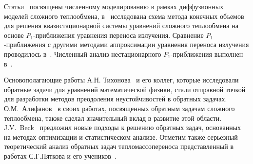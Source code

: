     Статьи~\cite{kovtanyuk2013iterative, Thommes2002, Pinnau2008, Siewert1991}
    посвящены численному моделированию в рамках
    диффузионных моделей сложного теплообмена, в~\cite{gallouet2016analysis} исследована схема
    метода конечных объемов для решения квазистационарной системы
    уравнений сложного теплообмена на основе
    $P_1$-приближения уравнения переноса излучения.
    Сравнение $P_1$-приближения с другими методами
    аппроксимации уравнения переноса излучения проводилось
    в~\cite{modest2014elliptic, frank2011adaptive, kovtanyuk2012, Thommes2002, Larsen2002, Frank2007}.
    Численный анализ нестационарного $P_1$-приближения выполнен
    в~\cite{Addam2015, olbrant2013asymptotic, frank2010optimal, frank2011adaptive, Frank2007}.

    Основополагающие работы А.Н. Тихонова~\cite{TikhonovSamarskii1972} и его коллег, которые
    исследовали обратные задачи для уравнений математической физики, стали
    отправной точкой для разработки методов преодоления неустойчивостей в обратных задачах.
    О.М.\ Алифанов~\cite{Aliphanov2009}
    в своих работах, посвященных обратным задачам сложного теплообмена, также
    сделал значительный вклад в развитие этой области.
    J.V.\ Beck~\cite{Beck1985-fg} предложил
    новые подходы к решению обратных задач, основанных на методах
    оптимизации и статистическом анализе.
    Отметим также серьезный теоретический анализ обратных задач тепломассопереноса
    представленный в работах С.Г.Пяткова и его учеников~\cite{Pyatkov19, Pyatkov22, Pyatkov23}.


